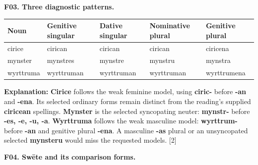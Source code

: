 \par\begin{minipage}{\linewidth}\raggedright
\textbf{F03. Three diagnostic patterns.}

\par\begingroup
\fontsize{10.5}{13.2}\selectfont
\setlength{\LTleft}{0pt}\setlength{\LTright}{\fill}
\noindent
\begin{tabular}{@{}>{\raggedright\arraybackslash}p{18.38mm}>{\raggedright\arraybackslash}p{24.17mm}>{\raggedright\arraybackslash}p{22.51mm}>{\raggedright\arraybackslash}p{24.17mm}>{\raggedright\arraybackslash}p{23.52mm}@{}}
\toprule
\textbf{Noun} & \textbf{Genitive singular} & \textbf{Dative singular} & \textbf{Nominative plural} & \textbf{Genitive plural} \\
\midrule
cirice & cirican & cirican & cirican & ciricena \\
mynster & mynstres & mynstre & mynstru & mynstra \\
wyrttruma & wyrttruman & wyrttruman & wyrttruman & wyrttrumena \\
\bottomrule
\end{tabular}
\par\endgroup

\textbf{Explanation:} \textbf{Cirice} follows the weak feminine model, using \textbf{ciric-} before \textbf{-an} and \textbf{-ena}. Its selected ordinary forms remain distinct from the reading’s supplied \textbf{ciricean} spellings. \textbf{Mynster} is the selected syncopating neuter: \textbf{mynstr-} before \textbf{-es, -e, -u, -a}. \textbf{Wyrttruma} follows the weak masculine model: \textbf{wyrttrum-} before \textbf{-an} and genitive plural \textbf{-ena}. A masculine \textbf{-as} plural or an unsyncopated selected \textbf{mynsteru} would miss the requested models. [2]

\end{minipage}\par\addvspace{4pt}

\textbf{F04. Swēte and its comparison forms.}


